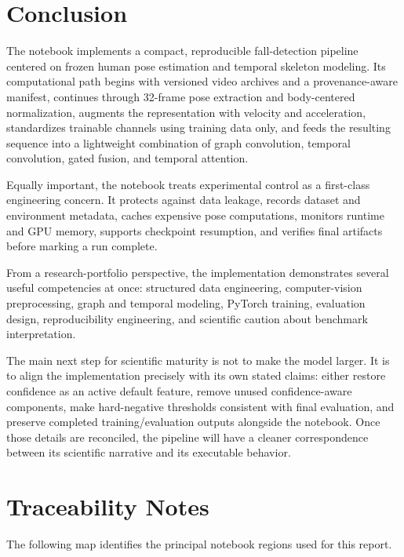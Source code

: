 \documentclass[11pt,a4paper]{article}
\begin{document}
\section{Conclusion}

The notebook implements a compact, reproducible fall-detection pipeline centered on frozen human pose estimation and temporal skeleton modeling. Its computational path begins with versioned video archives and a provenance-aware manifest, continues through 32-frame pose extraction and body-centered normalization, augments the representation with velocity and acceleration, standardizes trainable channels using training data only, and feeds the resulting sequence into a lightweight combination of graph convolution, temporal convolution, gated fusion, and temporal attention.

Equally important, the notebook treats experimental control as a first-class engineering concern. It protects against data leakage, records dataset and environment metadata, caches expensive pose computations, monitors runtime and GPU memory, supports checkpoint resumption, and verifies final artifacts before marking a run complete.

From a research-portfolio perspective, the implementation demonstrates several useful competencies at once: structured data engineering, computer-vision preprocessing, graph and temporal modeling, PyTorch training, evaluation design, reproducibility engineering, and scientific caution about benchmark interpretation.

The main next step for scientific maturity is not to make the model larger. It is to align the implementation precisely with its own stated claims: either restore confidence as an active default feature, remove unused confidence-aware components, make hard-negative thresholds consistent with final evaluation, and preserve completed training/evaluation outputs alongside the notebook. Once those details are reconciled, the pipeline will have a cleaner correspondence between its scientific narrative and its executable behavior.

\section*{Traceability Notes}

The following map identifies the principal notebook regions used for this report.
\end{document}
